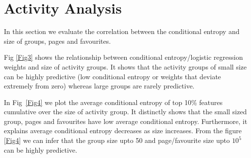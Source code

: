 \section{Activity Analysis}


In this section we evaluate the correlation between the conditional
entropy and size of groups, pages and favourites.

Fig \ref{Fig3} shows the relationship between conditional
    entropy/logistic regression weights and size of activity
    groups. It shows that the activity groups of small size can be
    highly predictive (low conditional entropy or weights that deviate
    extremely from zero) whereas large groups are rarely predictive.

In Fig~\ref{Fig4} we plot the average conditional entropy of top
    10\% features cumulative over the size of activity group. It
    distinctly shows that the small sized group, pages and favourites
    have low average conditional entropy. Furthermore, it explains
    average conditional entropy decreases as size increases. From the
    figure \ref{Fig4} we can infer that the group size upto 50 and
    page/favourite size upto $10^{5}$ can be highly predictive.

